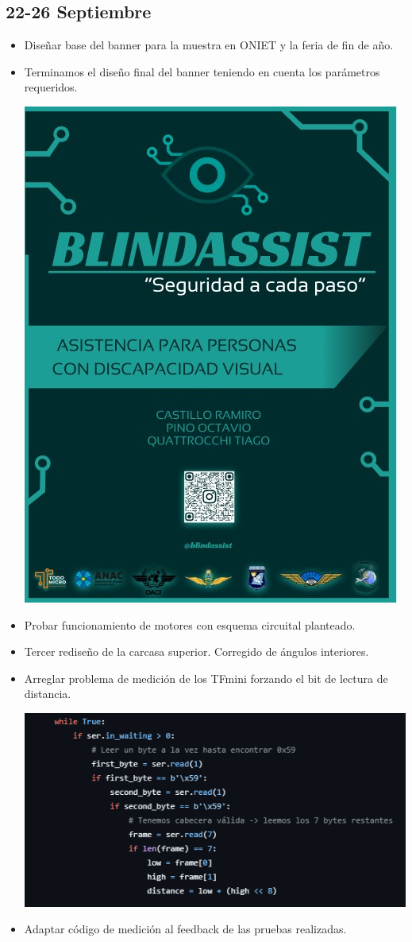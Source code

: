 \documentclass[12pt,a4paper]{article}
\begin{document}
\subsection*{22-26 Septiembre}

\begin{itemize}
\item Diseñar base del banner para la muestra en ONIET y la feria de fin de año.

\item Terminamos el diseño final del banner teniendo en cuenta los parámetros requeridos.

\includegraphics[width=0.5\linewidth]{Carpeta de campo/banner.png}
    
\item Probar funcionamiento de motores con esquema circuital planteado.

\item Tercer rediseño de la carcasa superior. Corregido de ángulos interiores.


    
\item Arreglar problema de medición de los TFmini forzando el bit de lectura de distancia.

\includegraphics[width=0.5\linewidth]{Carpeta de campo/arreglomed.png}

\item Adaptar código de medición al feedback de las pruebas realizadas.


\end{itemize}
\end{document}
